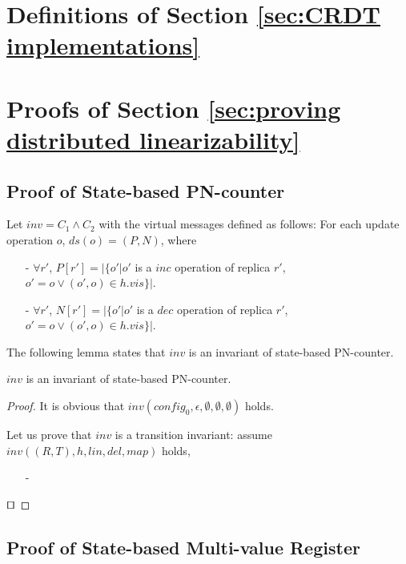 \section{Definitions of Section \ref{sec:CRDT implementations}}
\label{sec:appendix definitions of section CRDT implementations}








\section{Proofs of Section \ref{sec:proving distributed linearizability}}
\label{sec:appendix proofs of section proving distributed linearizability}









\subsection{Proof of State-based PN-counter}
\label{subsec:appendix proof of state-based PN-counter} 

Let $\mathit{inv} = C_1 \wedge C_2$ with the virtual messages defined as follows: For each update operation $o$, $\mathit{ds}(o) = (P,N)$, where

\begin{itemize}
\setlength{\itemsep}{0.5pt}
\item[-] $\forall r'$, $P[r'] = \vert \{ o' \vert o'$ is a $\mathit{inc}$ operation of replica $r'$, $o' = o \vee (o',o) \in h.\mathit{vis} \} \vert$.

\item[-] $\forall r'$, $N[r'] = \vert \{ o' \vert o'$ is a $\mathit{dec}$ operation of replica $r'$, $o' = o \vee (o',o) \in h.\mathit{vis} \} \vert$.
\end{itemize} 

The following lemma states that $\mathit{inv}$ is an invariant of state-based PN-counter. 

\begin{lemma}
\label{lemma:inv is an invariant of state-based CRDT for state-based PN-counter} 
$\mathit{inv}$ is an invariant of state-based PN-counter. 
\end{lemma}

\begin {proof} 

It is obvious that $\mathit{inv}(\mathit{config}_0,\epsilon,\emptyset,\emptyset,\emptyset)$ holds. 

Let us prove that $\mathit{inv}$ is a transition invariant: assume $\mathit{inv}((R,T),h,\mathit{lin},\mathit{del},\mathit{map})$ holds,  

\begin{itemize}
\setlength{\itemsep}{0.5pt}
\item[-] 
\end{itemize} 

$\qed$
\end {proof}




\subsection{Proof of State-based Multi-value Register}
\label{subsec:appendix proof of state-based multi-value register}
